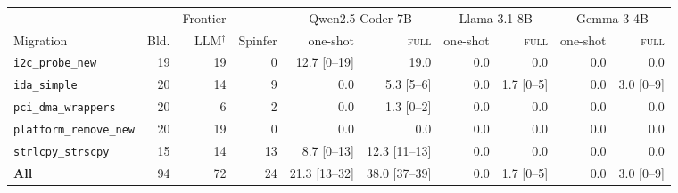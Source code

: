 \begin{tabular}{lrrrrrrrrr}
\toprule
 & & Frontier & & \multicolumn{2}{c}{Qwen2.5-Coder 7B} & \multicolumn{2}{c}{Llama 3.1 8B} & \multicolumn{2}{c}{Gemma 3 4B} \\
\cmidrule(lr){5-6}\cmidrule(lr){7-8}\cmidrule(lr){9-10}
Migration & Bld. & LLM$^\dagger$ & Spinfer & one-shot & \textsc{full} & one-shot & \textsc{full} & one-shot & \textsc{full} \\
\midrule
\texttt{i2c\_probe\_new} & 19 & 19 & 0 & 12.7 [0--19] & 19.0 & 0.0 & 0.0 & 0.0 & 0.0 \\
\texttt{ida\_simple} & 20 & 14 & 9 & 0.0 & 5.3 [5--6] & 0.0 & 1.7 [0--5] & 0.0 & 3.0 [0--9] \\
\texttt{pci\_dma\_wrappers} & 20 & 6 & 2 & 0.0 & 1.3 [0--2] & 0.0 & 0.0 & 0.0 & 0.0 \\
\texttt{platform\_remove\_new} & 20 & 19 & 0 & 0.0 & 0.0 & 0.0 & 0.0 & 0.0 & 0.0 \\
\texttt{strlcpy\_strscpy} & 15 & 14 & 13 & 8.7 [0--13] & 12.3 [11--13] & 0.0 & 0.0 & 0.0 & 0.0 \\
\midrule
\textbf{All} & 94 & 72 & 24 & 21.3 [13--32] & 38.0 [37--39] & 0.0 & 1.7 [0--5] & 0.0 & 3.0 [0--9] \\
\bottomrule
\end{tabular}

